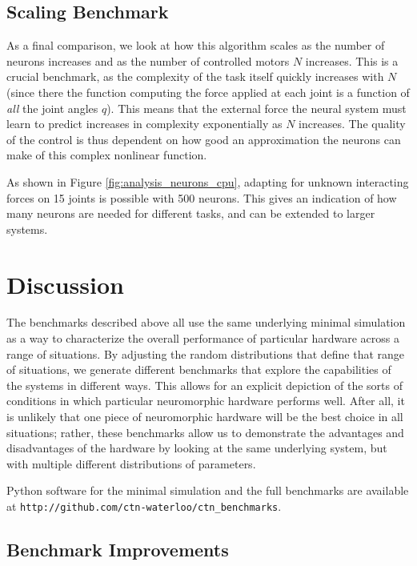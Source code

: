 \documentclass{frontiersSCNS} %
\begin{document}
\subsection{Scaling Benchmark}

As a final comparison, we look at how this algorithm scales as the number
of neurons increases and as the number of controlled motors $N$ increases.  This
is a crucial benchmark, as the complexity of the task itself quickly
increases with $N$ (since there the function computing the force applied
at each joint is a function of \emph{all} the joint angles $q$).  This means
that the external force the neural system must learn to predict increases
in complexity exponentially as $N$ increases.  The quality of the control
is thus dependent on how good an approximation the neurons can make of this
complex nonlinear function.

As shown in Figure \ref{fig:analysis_neurons_cpu}, adapting for unknown
interacting forces on 15 joints is possible with 500 neurons.  This gives
an indication of how many neurons are needed for different tasks, and can
be extended to larger systems.

\section{Discussion}

The benchmarks described above all use the same underlying minimal simulation
as a way to characterize the overall performance of particular hardware
across a range of situations.  By adjusting the random distributions that
define that range of situations, we generate different benchmarks that
explore the capabilities of the systems in different ways.  This allows for
an explicit depiction of the sorts of conditions in which particular
neuromorphic hardware performs well.  After all, it is unlikely that one
piece of neuromorphic hardware will be the best choice in all situations;
rather, these benchmarks allow us to demonstrate the advantages and disadvantages
of the hardware by looking at the same underlying system, but with multiple
different distributions of parameters.

Python software for the minimal simulation and the full benchmarks are
available at \texttt{http://github.com/ctn-waterloo/ctn\_benchmarks}.

\subsection{Benchmark Improvements}
\end{document}
